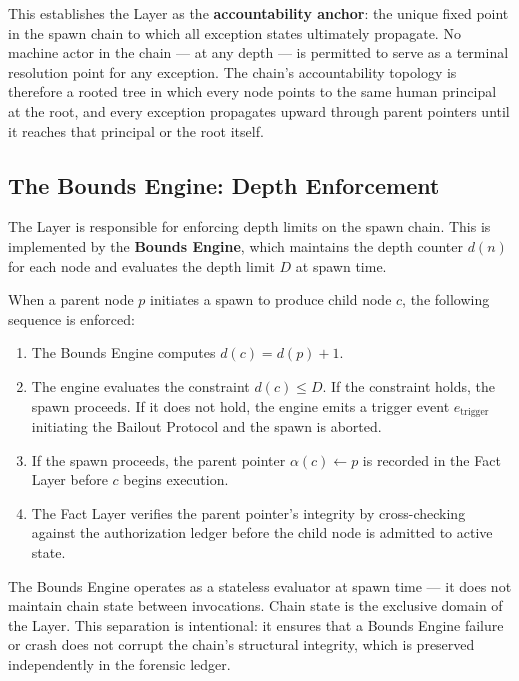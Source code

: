 This establishes the \purpose{} Layer as the \textbf{accountability anchor}: the unique fixed point in the spawn chain to which all exception states ultimately propagate. No machine actor in the chain — at any depth — is permitted to serve as a terminal resolution point for any exception. The chain's accountability topology is therefore a rooted tree in which every node points to the same human principal at the root, and every exception propagates upward through parent pointers until it reaches that principal or the root itself.

\subsection{The Bounds Engine: Depth Enforcement}
\label{sec:bounds-depth}

The \bounds{} Layer is responsible for enforcing depth limits on the spawn chain. This is implemented by the \textbf{Bounds Engine}, which maintains the depth counter $d(n)$ for each node and evaluates the depth limit $D$ at spawn time.

When a parent node $p$ initiates a spawn to produce child node $c$, the following sequence is enforced:

\begin{enumerate}\itemsep0em
\item The Bounds Engine computes $d(c) = d(p) + 1$.
\item The engine evaluates the constraint $d(c) \leq D$. If the constraint holds, the spawn proceeds. If it does not hold, the engine emits a trigger event $e_{\text{trigger}}$ initiating the Bailout Protocol and the spawn is aborted.
\item If the spawn proceeds, the parent pointer $\alpha(c) \leftarrow p$ is recorded in the Fact Layer before $c$ begins execution.
\item The Fact Layer verifies the parent pointer's integrity by cross-checking against the authorization ledger before the child node is admitted to active state.
\end{enumerate}

The Bounds Engine operates as a stateless evaluator at spawn time — it does not maintain chain state between invocations. Chain state is the exclusive domain of the \fact{} Layer. This separation is intentional: it ensures that a Bounds Engine failure or crash does not corrupt the chain's structural integrity, which is preserved independently in the forensic ledger.

